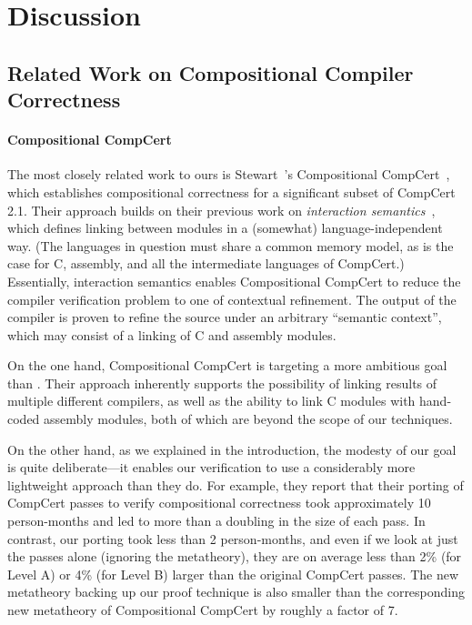 \section{Discussion}
\label{sec:sepcomp:discussion}





\subsection{Related Work on Compositional Compiler Correctness}

\paragraph{Compositional CompCert}

The most closely related work to ours is Stewart~\etal's Compositional
CompCert~\cite{stewart+:popl2015}, which establishes compositional correctness for a
significant subset of CompCert 2.1.  Their approach builds on their
previous work on \emph{interaction semantics}~\cite{beringer+:esop14}, which defines
linking between modules in a (somewhat) language-independent way.
(The languages in question must share a common memory model, as is the
case for C, assembly, and all the intermediate languages of CompCert.)
Essentially, interaction semantics enables Compositional CompCert to
reduce the compiler verification problem to one of contextual
refinement.  The output of the compiler is proven to refine the source
under an arbitrary ``semantic context'', which may consist of a
linking of C and assembly modules.

On the one hand, Compositional CompCert is targeting a more ambitious
goal than \sepcomp{}.  Their approach inherently supports the
possibility of linking results of multiple different compilers, as
well as the ability to link C modules with hand-coded assembly
modules, both of which are beyond the scope of our techniques.

On the other hand, as we explained in the introduction, the modesty of
our goal is quite deliberate---it enables our \sepcomp{} verification
to use a considerably more lightweight approach than they do.  For
example, they report that their porting of CompCert passes to verify
compositional correctness took approximately 10 person-months and led
to more than a doubling in the size of each pass.  In contrast, our
porting took less than 2 person-months, and even if we look at just
the passes alone (ignoring the metatheory), they are on average less
than 2\% (for Level A) or 4\% (for Level B) larger than the original
CompCert passes.  The new metatheory backing up our proof technique is
also smaller than the corresponding new metatheory of Compositional
CompCert by roughly a factor of 7.

